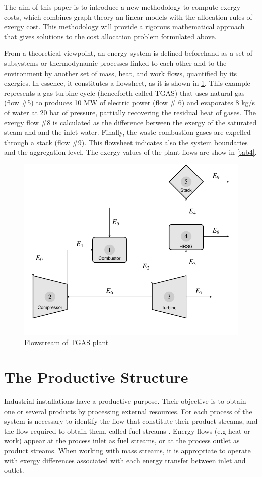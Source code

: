 \documentclass{ecos2018}
\begin{document}
The aim of this paper is to introduce a new methodology to compute exergy costs, which combines graph theory an linear models with the allocation rules of exergy cost. This methodology will provide a rigorous mathematical approach that gives solutions to the cost allocation problem formulated above.

From a theoretical viewpoint, an energy system is defined beforehand as a set of subsystems or thermodynamic processes linked to each other and to the environment by another set of mass, heat, and work flows, quantified by its exergies. In essence, it constitutes a flowsheet, as it is shown in \cref{fig1}. This example represents a gas turbine cycle (henceforth called TGAS) that uses natural gas (flow \#5) to produces 10 MW of electric power (flow \# 6) and evaporates 8 kg/s of water at 20 bar of pressure, partially recovering the residual heat of gases. The exergy flow \#8 is calculated as the difference between the exergy of the saturated steam and and the inlet water. Finally, the waste combustion gases are expelled through a stack (flow \#9). This flowsheet indicates also the system boundaries and the aggregation level. The exergy values of the plant flows are show in \cref{tab4}.  

\begin{figure}[h]
	\centering
	\includegraphics[width=0.65\linewidth]{tgas.pdf}
	\caption{Flowstream of TGAS plant}
	\label{fig1}
\end{figure}

\section{The Productive Structure}
Industrial installations have a productive purpose. Their objective is to obtain one or several products by processing external resources. For each process of the system is necessary to identify the flow that constitute their product streams, and the flow  required to obtain them, called fuel streams \cite{Tsatsaronis1985,SPECO06}. Energy flows (e.g heat or work) appear at the process inlet as fuel streams, or at the process outlet as product streams. When working with mass streams, it is appropriate to operate with exergy differences associated with each energy transfer between inlet and outlet.
\end{document}
